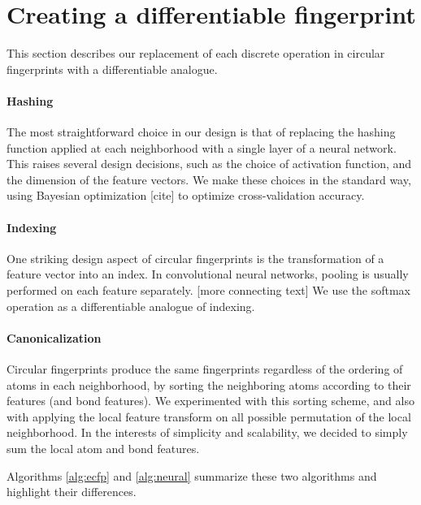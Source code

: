 \documentclass{article}
\begin{document}
\section{Creating a differentiable fingerprint}
This section describes our replacement of each discrete operation in circular fingerprints with a differentiable analogue.

\paragraph{Hashing}
The most straightforward choice in our design is that of replacing the hashing function applied at each neighborhood with a single layer of a neural network.
This raises several design decisions, such as the choice of activation function, and the dimension of the feature vectors.
We make these choices in the standard way, using Bayesian optimization [cite] to optimize cross-validation accuracy.

\paragraph{Indexing}
One striking design aspect of circular fingerprints is the transformation of a feature vector into an index.
In convolutional neural networks, pooling is usually performed on each feature separately.
[more connecting text]
We use the softmax operation as a differentiable analogue of indexing.

\paragraph{Canonicalization}
Circular fingerprints produce the same fingerprints regardless of the ordering of atoms in each neighborhood, by sorting the neighboring atoms according to their features (and bond features).
We experimented with this sorting scheme, and also with applying the local feature transform on all possible permutation of the local neighborhood.
In the interests of simplicity and scalability, we decided to simply sum the local atom and bond features.

Algorithms \ref{alg:ecfp} and \ref{alg:neural} summarize these two algorithms and highlight their differences.
\end{document}

